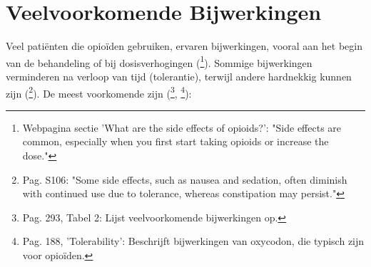 \documentclass[11pt, a4paper]{report} %
\begin{document}
\section{Veelvoorkomende Bijwerkingen}
Veel patiënten die opioïden gebruiken, ervaren bijwerkingen, vooral aan het begin van de behandeling of bij dosisverhogingen (\cite{ClevelandClinicOpioids}\footnote{Webpagina sectie 'What are the side effects of opioids?': "Side effects are common, especially when you first start taking opioids or increase the dose."}). Sommige bijwerkingen verminderen na verloop van tijd (tolerantie), terwijl andere hardnekkig kunnen zijn (\cite{Benyamin2008OpioidComplications}\footnote{Pag. S106: "Some side effects, such as nausea and sedation, often diminish with continued use due to tolerance, whereas constipation may persist."}). De meest voorkomende zijn (\cite{Gupta2010ChemistryOpioids}\footnote{Pag. 293, Tabel 2: Lijst veelvoorkomende bijwerkingen op.}, \cite{Riley2008OxycodoneReview}\footnote{Pag. 188, 'Tolerability': Beschrijft bijwerkingen van oxycodon, die typisch zijn voor opioïden.}):
\end{document}
